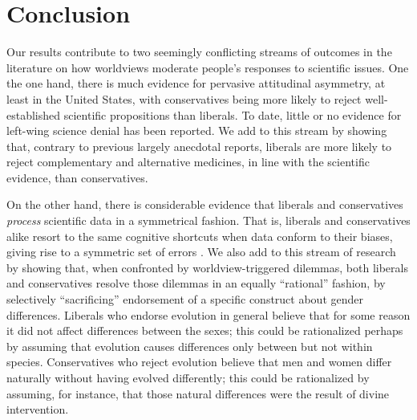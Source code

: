 \documentclass[fignum,man]{apa}\usepackage[]{graphicx}\usepackage[]{color}
\begin{document}
\section{Conclusion}
Our results contribute to two seemingly conflicting streams 
of outcomes
in the literature on 
how worldviews moderate people's responses to scientific issues. 
One the one hand, there is much evidence for pervasive attitudinal
asymmetry, at least in the United States, with conservatives being more likely to reject
well-established scientific propositions than liberals. To date,
little or no evidence for left-wing science denial has been reported.
We add to this stream by showing that, contrary to previous largely
anecdotal reports, liberals are more likely to reject complementary
and alternative medicines, in line with the scientific evidence, than
conservatives. 

On the other hand, there is considerable evidence that
liberals and conservatives \textit{process} scientific data
in a symmetrical fashion. That is, liberals and conservatives
alike resort to the same cognitive shortcuts when data conform to their
biases, giving rise to a symmetric set of errors \cite{Kahan17b,Washburn17}.
We also add to this stream of research by showing that, when confronted
by worldview-triggered dilemmas, both liberals and conservatives
resolve those dilemmas in an equally ``rational'' fashion,
by selectively ``sacrificing'' endorsement of a specific
construct about gender differences. 
Liberals who endorse evolution in general believe that for 
some reason it did not affect differences between the sexes; 
this could be rationalized perhaps by assuming that evolution causes 
differences only between but not within species. 
Conservatives who reject evolution believe that men and women differ 
naturally without having evolved differently; this could be 
rationalized by assuming, for instance, that those natural differences 
were the result of divine intervention.




\end{document}
